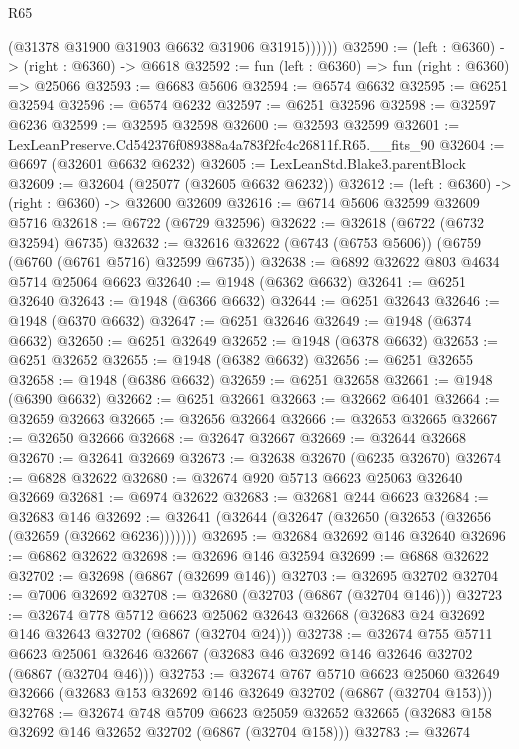 \begin{lexlean}{R65}
\begin{coremodule}
{              (@31378 @31900 @31903 @6632 @31906 @31915))))))
@32590 := (left : @6360) -> (right : @6360) -> @6618
@32592 := fun (left : @6360) => fun (right : @6360) => @25066
@32593 := @6683 @5606
@32594 := @6574 @6632
@32595 := @6251 @32594
@32596 := @6574 @6232
@32597 := @6251 @32596
@32598 := @32597 @6236
@32599 := @32595 @32598
@32600 := @32593 @32599
@32601 := LexLeanPreserve.Cd542376f089388a4a783f2fc4c26811f.R65.__fits_90
@32604 := @6697 (@32601 @6632 @6232)
@32605 := LexLeanStd.Blake3.parentBlock
@32609 := @32604 (@25077 (@32605 @6632 @6232))
@32612 := (left : @6360) -> (right : @6360) -> @32600 @32609
@32616 := @6714 @5606 @32599 @32609 @5716
@32618 := @6722 (@6729 @32596)
@32622 := @32618 (@6722 (@6732 @32594) @6735)
@32632 := @32616 @32622 (@6743 (@6753 @5606)) (@6759 (@6760 (@6761 @5716) @32599 @6735))
@32638 := @6892 @32622 @803 @4634 @5714 @25064 @6623
@32640 := @1948 (@6362 @6632)
@32641 := @6251 @32640
@32643 := @1948 (@6366 @6632)
@32644 := @6251 @32643
@32646 := @1948 (@6370 @6632)
@32647 := @6251 @32646
@32649 := @1948 (@6374 @6632)
@32650 := @6251 @32649
@32652 := @1948 (@6378 @6632)
@32653 := @6251 @32652
@32655 := @1948 (@6382 @6632)
@32656 := @6251 @32655
@32658 := @1948 (@6386 @6632)
@32659 := @6251 @32658
@32661 := @1948 (@6390 @6632)
@32662 := @6251 @32661
@32663 := @32662 @6401
@32664 := @32659 @32663
@32665 := @32656 @32664
@32666 := @32653 @32665
@32667 := @32650 @32666
@32668 := @32647 @32667
@32669 := @32644 @32668
@32670 := @32641 @32669
@32673 := @32638 @32670 (@6235 @32670)
@32674 := @6828 @32622
@32680 := @32674 @920 @5713 @6623 @25063 @32640 @32669
@32681 := @6974 @32622
@32683 := @32681 @244 @6623
@32684 := @32683 @146
@32692 := @32641 (@32644 (@32647 (@32650 (@32653 (@32656 (@32659 (@32662 @6236)))))))
@32695 := @32684 @32692 @146 @32640
@32696 := @6862 @32622
@32698 := @32696 @146 @32594
@32699 := @6868 @32622
@32702 := @32698 (@6867 (@32699 @146))
@32703 := @32695 @32702
@32704 := @7006 @32692
@32708 := @32680 (@32703 (@6867 (@32704 @146)))
@32723 := @32674
    @778
    @5712
    @6623
    @25062
    @32643
    @32668
    (@32683 @24 @32692 @146 @32643 @32702 (@6867 (@32704 @24)))
@32738 := @32674
    @755
    @5711
    @6623
    @25061
    @32646
    @32667
    (@32683 @46 @32692 @146 @32646 @32702 (@6867 (@32704 @46)))
@32753 := @32674
    @767
    @5710
    @6623
    @25060
    @32649
    @32666
    (@32683 @153 @32692 @146 @32649 @32702 (@6867 (@32704 @153)))
@32768 := @32674
    @748
    @5709
    @6623
    @25059
    @32652
    @32665
    (@32683 @158 @32692 @146 @32652 @32702 (@6867 (@32704 @158)))
@32783 := @32674
}
\end{coremodule}
\end{lexlean}
